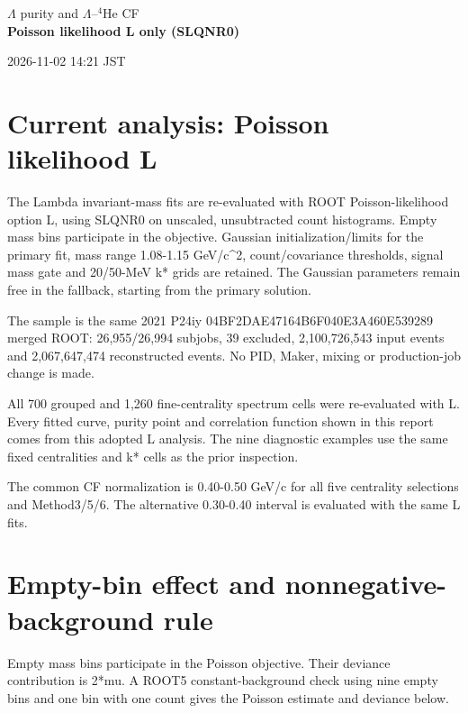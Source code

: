 \documentclass[10pt,a4paper]{article}
\begin{document}
\begin{center}{\Large $\Lambda$ purity and $\Lambda$--$^4$He CF}\\[0.4em]
{\Large\bfseries Poisson likelihood L only (SLQNR0)}\end{center}
2026-11-02 14:21 JST


\section*{Current analysis: Poisson likelihood L}
The Lambda invariant-mass fits are re-evaluated with ROOT Poisson-likelihood option L, using SLQNR0 on unscaled, unsubtracted count histograms. Empty mass bins participate in the objective. Gaussian initialization/limits for the primary fit, mass range 1.08-1.15 GeV/c\textasciicircum{}2, count/covariance thresholds, signal mass gate and 20/50-MeV k* grids are retained. The Gaussian parameters remain free in the fallback, starting from the primary solution.

The sample is the same 2021 P24iy 04BF2DAE47164B6F040E3A460E539289 merged ROOT: 26,955/26,994 subjobs, 39 excluded, 2,100,726,543 input events and 2,067,647,474 reconstructed events. No PID, Maker, mixing or production-job change is made.

All 700 grouped and 1,260 fine-centrality spectrum cells were re-evaluated with L. Every fitted curve, purity point and correlation function shown in this report comes from this adopted L analysis. The nine diagnostic examples use the same fixed centralities and k* cells as the prior inspection.

The common CF normalization is 0.40-0.50 GeV/c for all five centrality selections and Method3/5/6. The alternative 0.30-0.40 interval is evaluated with the same L fits.

\clearpage
\section*{Empty-bin effect and nonnegative-background rule}
Empty mass bins participate in the Poisson objective. Their deviance contribution is 2*mu. A ROOT5 constant-background check using nine empty bins and one bin with one count gives the Poisson estimate and deviance below.
\end{document}
